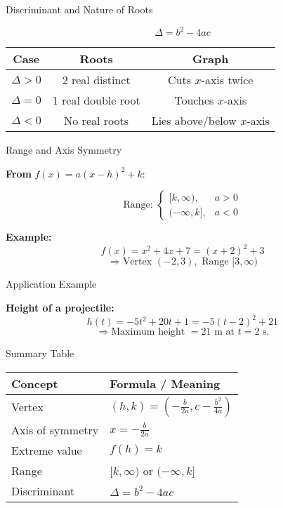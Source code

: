 \documentclass[12pt]{beamer}
\begin{document}
\begin{frame}{Discriminant and Nature of Roots}

\[
\Delta = b^2 - 4ac
\]

\begin{center}
\begin{tabular}{c|c|c}
Case & Roots & Graph \\ \hline
$\Delta > 0$ & 2 real distinct & Cuts $x$-axis twice \\
$\Delta = 0$ & 1 real double root & Touches $x$-axis \\
$\Delta < 0$ & No real roots & Lies above/below $x$-axis
\end{tabular}
\end{center}

\end{frame}

\begin{frame}{Range and Axis Symmetry}

\textbf{From } $f(x) = a(x-h)^2 + k$:

\[
\text{Range: } 
\begin{cases}
[k, \infty), & a>0 \\[4pt]
(-\infty, k], & a<0
\end{cases}
\]

\pause
\textbf{Example:}
\[
f(x) = x^2 + 4x + 7 = (x+2)^2 + 3
\]
\[
\Rightarrow \text{Vertex } (-2, 3), \text{ Range } [3, \infty)
\]

\end{frame}

\begin{frame}{Application Example}

\textbf{Height of a projectile:}
\[
h(t) = -5t^2 + 20t + 1 = -5(t-2)^2 + 21
\]
\[
\Rightarrow \text{Maximum height } = 21 \text{ m at } t = 2 \text{ s.}
\]

\end{frame}

\begin{frame}{Summary Table}

\begin{center}
\begin{tabular}{l|l}
\textbf{Concept} & \textbf{Formula / Meaning} \\ \hline
Vertex & $(h, k) = (-\tfrac{b}{2a}, c - \tfrac{b^2}{4a})$ \\
Axis of symmetry & $x = -\tfrac{b}{2a}$ \\
Extreme value & $f(h) = k$ \\
Range & $[k, \infty)$ or $(-\infty, k]$ \\
Discriminant & $\Delta = b^2 - 4ac$
\end{tabular}
\end{center}

\end{frame}
\end{document}
